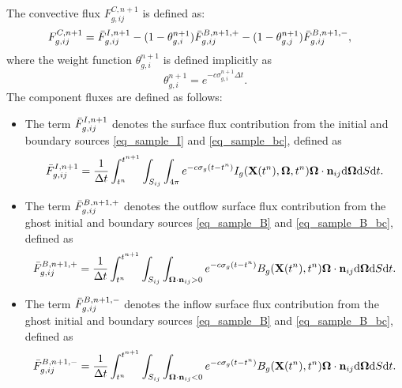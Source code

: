 \documentclass[preprint,12pt]{elsarticle}
\theoremstyle{definition}
\theoremstyle{plain}
\numberwithin{equation}{section}
\numberwithin{algorithm}{section}
\newcounter{eq_count}
\newcommand{\vOmega}{\mathbf{\Omega}}
\newcommand{\mfx}{{\mathbf{X}}}
\newcommand{\dd}{{\text{d}}}
\begin{document}
The  convective flux $F_{g,ij}^{C,n+1}$ is defined as:
\begin{equation}          \label{eq_fulldis_fluxA}
        \begin{aligned}  
            &F_{g,ij}^{C,n+1} =  
            \Bar{F}_{g,ij}^{I,n+1} 
            - (1 - \theta_{g,i}^{n+1}) \Bar{F}_{g,ij}^{B,n+1,+}
            - (1 - \theta_{g,j}^{n+1}) \Bar{F}_{g,ij}^{B,n+1,-},
        \end{aligned}
    \end{equation}
     where the weight function  $\theta_{g,i}^{n+1}$  is  defined implicitly as 
    \begin{equation}
        \theta_{g,i}^{n+1} =  e^{-c \sigma_{g,i}^{n+1} \Delta t}. %
    \end{equation}
    The component fluxes are defined as follows:
    \begin{itemize}
        \item The term $\Bar{F}_{g,ij}^{I,n+1}$ denotes the surface flux contribution from the initial and boundary sources \eqref{eq_sample_I} and \eqref{eq_sample_bc}, defined as
        \begin{equation}
            \Bar{F}_{g,ij}^{I,n+1} = \frac{1}{\Delta t} 
            \int^{t^{n+1}}_{t^n}  
            \int_{S_{ij} }  
            \int_{4 \pi}  
           e^{- c  \sigma_g (t - t^n)}   
            I_{g} ( \mfx(t^n), \vOmega,t^n ) 
            \vOmega \cdot \mathbf{n}_{ij} 
            \dd{\vOmega} \dd{S}  \dd{t}.
        \end{equation}
            \item The term $\Bar{F}_{g,ij}^{B,n+1,+}$  denotes the outflow surface flux contribution from the ghost initial and boundary sources \eqref{eq_sample_B} and \eqref{eq_sample_B_bc}, defined as
            \begin{equation}
            \Bar{F}_{g,ij}^{B,n+1,+}= 
            \frac{1}{\Delta t} 
            \int^{t^{n+1}}_{t^n}   
            \int_{S_{ij} }  
            \int_{\vOmega \cdot \mathbf{n}_{ij} > 0 }
            e^{- c  \sigma_g (t - t^n)}  B_{g} ( \mfx(t^n),t^n )  \vOmega \cdot \mathbf{n}_{ij} 
            \dd{\vOmega} \dd{S} \dd{t}.
        \end{equation}
            \item The term $\Bar{F}_{g,ij}^{B,n+1,-}$ denotes the inflow surface flux contribution from the ghost initial and boundary sources \eqref{eq_sample_B} and \eqref{eq_sample_B_bc}, defined as
                        \begin{equation}
            \Bar{F}_{g,ij}^{B,n+1,-}= 
            \frac{1}{\Delta t} 
            \int^{t^{n+1}}_{t^n}   
            \int_{S_{ij} }  
            \int_{\vOmega \cdot \mathbf{n}_{ij} < 0  }
            e^{- c  \sigma_g (t - t^n)}  B_{g} ( \mfx(t^n),t^n )  \vOmega \cdot \mathbf{n}_{ij} 
            \dd{\vOmega} \dd{S} \dd{t}.
        \end{equation}
    \end{itemize}
\end{document}
